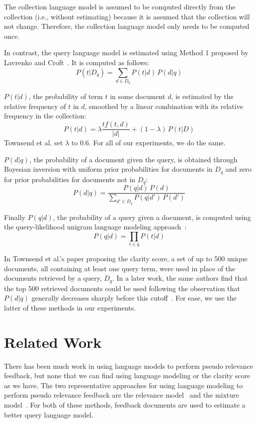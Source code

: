 \documentclass[format=sigconf, screen=true, review=false]{acmart}
\begin{document}
The collection language model is assumed to be computed directly from the collection (i.e., without estimating) because it is assumed that the collection will not change.
Therefore, the collection language model only needs to be computed once.

In contrast, the query language model is estimated using Method 1 proposed by Lavrenko and Croft~\cite{10.1145/383952.383972}.
It is computed as follows:
\begin{equation}
P(t|D_q) = \sum_{d \in D_q} P(t | d)\,P(d | q)
\end{equation}

$P(t|d)$, the probability of term $t$ in some document $d$, is estimated by the relative frequency of $t$ in $d$, smoothed by a linear combination with its relative frequency in the collection:
\begin{equation}
P(t | d) = \lambda \frac{tf(t,d)}{|d|} + (1-\lambda)\, P(t | D)
\end{equation}
Townsend et al. set $\lambda$ to 0.6. For all of our experiments, we do the same.

$P(d|q)$, the probability of a document given the query, is obtained through Bayesian inversion with uniform prior probabilities for documents in $D_q$ and zero for prior probabilities for documents not in $D_q$:
\begin{equation}
P(d|q) = \frac{P(q|d)\, P(d)}{\sum_{d' \in D_q}P(q | d')\, P(d')}
\end{equation}

Finally $P(q|d)$, the probability of a query given a document, is computed using the query-likelihood unigram language modeling approach~\cite{10.1145/319950.320022}:
\begin{equation}
P(q|d)=\prod_{t\in q} P(t|d)
\end{equation}

In Townsend et al.'s paper proposing the clarity score, a set of up to 500 unique documents, all containing at least one query term, were used in place of the documents retrieved by a query, $D_q$.
In a later work, the same authors find that the top 500 retrieved documents could be used following the observation that $P(d|q)$ generally decreases sharply before this cutoff~\cite{10.1007/s10791-006-9006-4}.
For ease, we use the latter of these methods in our experiments.

\section{Related Work}
There has been much work in using language models to perform pseudo relevance feedback, but none that we can find using language modeling or the clarity score as we have.
The two representative approaches for using language modeling to perform pseudo relevance feedback are the relevance model~\cite{10.1145/383952.383972} and the mixture model~\cite{10.1145/502585.502654}.
For both of these methods, feedback documents are used to estimate a better query language model.
\end{document}
